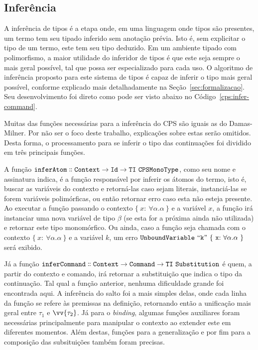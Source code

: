 \subsection{Inferência}\label{subsec:cps-inferer}
A inferência de tipos é a etapa onde, em uma linguagem onde tipos são presentes, um termo tem seu tipado inferido sem anotação prévia.
Isto é, sem explicitar o tipo de um termo, este tem seu tipo deduzido.
Em um ambiente tipado com polimorfismo, a maior utilidade do inferidor de tipos é que este seja sempre o mais geral possível, tal que possa ser especializado para cada uso.
O algoritmo de inferência proposto para este sistema de tipos é capaz de inferir o tipo mais geral possível, conforme explicado mais detalhadamente na Seção~\ref{sec:formalizacao}.
Seu desenvolvimento foi direto como pode ser visto abaixo no Código~\ref{cps:infer-command}.


Muitas das funções necessárias para a inferência do CPS são iguais as do Damas-Milner.
Por não ser o foco deste trabalho, explicações sobre estas serão omitidos.
Desta forma, o processamento para se inferir o tipo das continuações foi dividido em três principais funções.

A função $\mathtt{inferAtom \dblcolon Context \to Id \to TI\ CPSMonoType}$, como seu nome e assinatura indica, é a função responsável por inferir os átomos do termo, isto é, buscar as variáveis do contexto e retorná-las caso sejam literais, instanciá-las se forem variáveis polimórficas, ou então retornar erro caso esta não esteja presente.
Ao executar a função passando o contexto $\{\ x{:}\ \forall\alpha.\alpha \ \}$ e a variável $x$, a função irá instanciar uma nova variável de tipo $\beta$ (se esta for a próxima ainda não utilizada) e retornar este tipo monomórfico.
Ou ainda, caso a função seja chamada com o contexto $\{\ x{:}\ \forall\alpha.\alpha \ \}$ e a variável $k$, um erro $\mathtt{UnboundVariable\ ``k"\ \{\ x{:}\ \forall\alpha.\alpha \ \}}$ será exibido.

Já a função $\mathtt{inferCommand \dblcolon Context \to Command \to TI\ Substitution}$ é quem, a partir do contexto e comando, irá retornar a substituição que indica o tipo da continuação.
Tal qual a função anterior, nenhuma dificuldade grande foi encontrada aqui.
A inferência do salto foi a mais simples delas, onde cada linha da função se refere às premissas na definição, retornando então a unificação mais geral entre $\tau_1$ e $\vv{\tau_2}$.
Já para o \textit{binding}, algumas funções auxiliares foram necessárias principalmente para manipular o contexto ao extender este em diferentes momentos.
Além destas, funções para a generalização e por fim para a composição das subsituições também foram precisas.

